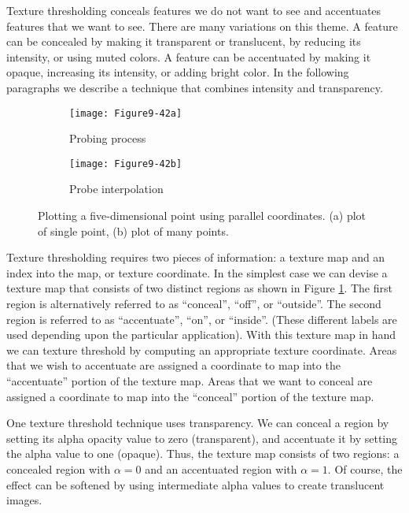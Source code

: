 Texture thresholding conceals features we do not want to see and accentuates features that we want to see. There are many variations on this theme. A feature can be concealed by making it transparent or translucent, by reducing its intensity, or using muted colors. A feature can be accentuated by making it opaque, increasing its intensity, or adding bright color. In the following paragraphs we describe a technique that combines intensity and transparency.

\begin{figure}[htb]
	\begin{subfigure}[h]{0.48\linewidth}
		\texttt{[image: Figure9-42a]}
		\captionsetup{justification=centering}
		\caption{Probing process}
		\label{fig:Figure9-42a}
	\end{subfigure}
	\hfill
	\begin{subfigure}[h]{0.48\linewidth}
		\texttt{[image: Figure9-42b]}
		\captionsetup{justification=centering}
		\caption{Probe interpolation}
		\label{fig:Figure9-42b}
	\end{subfigure}
	\caption{Plotting a five-dimensional point using parallel coordinates. (a) plot of single point, (b) plot of many points.}\label{fig:Figure9-42}
\end{figure}

Texture thresholding requires two pieces of information: a texture map and an index into the map, or texture coordinate. In the simplest case we can devise a texture map that consists of two distinct regions as shown in Figure \ref{fig:Figure9-42a}. The first region is alternatively referred to as ``conceal'', ``off'', or ``outside''. The second region is referred to as ``accentuate'', ``on'', or ``inside''. (These different labels are used depending upon the particular application). With this texture map in hand we can texture threshold by computing an appropriate texture coordinate. Areas that we wish to accentuate are assigned a coordinate to map into the ``accentuate'' portion of the texture map. Areas that we want to conceal are assigned a coordinate to map into the ``conceal'' portion of the texture map.

One texture threshold technique uses transparency. We can conceal a region by setting its alpha opacity value to zero (transparent), and accentuate it by setting the alpha value to one (opaque). Thus, the texture map consists of two regions: a concealed region with $\alpha = 0$ and an accentuated region with $\alpha = 1$. Of course, the effect can be softened by using intermediate alpha values to create translucent images.

